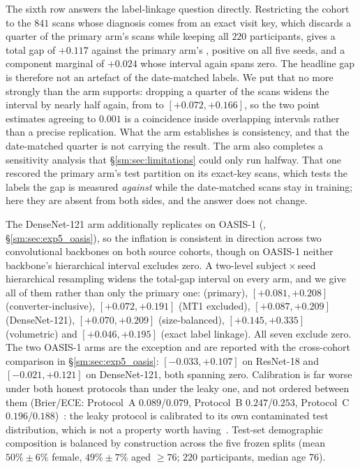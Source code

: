 \documentclass[11pt]{article}
\begin{document}
The sixth row answers the label-linkage question directly. Restricting
the cohort to the $841$ scans whose diagnosis comes from an exact visit
key, which discards a quarter of the primary arm's scans while keeping
all $220$ participants, gives a total gap of $+0.117$ against the
primary arm's \AdniGapTotal{}, positive on all five seeds, and a component
marginal of $+0.024$ whose interval again spans zero. The headline gap
is therefore not an artefact of the date-matched labels. We put that no
more strongly than the arm supports: dropping a quarter of the scans
widens the interval by nearly half again, from
\AdniGapCI{} to $[+0.072, +0.166]$, so the two point estimates
agreeing to $0.001$ is a coincidence inside overlapping intervals rather
than a precise replication. What the arm establishes is consistency, and
that the date-matched quarter is not carrying the result. The arm also
completes a sensitivity analysis that \S\ref{sm:sec:limitations} could
only run halfway. That one rescored the primary arm's test partition on
its exact-key scans, which tests the labels the gap is measured
\emph{against} while the date-matched scans stay in training; here they
are absent from both sides, and the answer does not change.

The DenseNet-121 arm additionally replicates on OASIS-1
(\OasisDenseGap{}, \S\ref{sm:sec:exp5_oasis}), so the inflation is
consistent in direction across two convolutional backbones on both
source cohorts, though on OASIS-1 neither backbone's hierarchical
interval excludes zero. A two-level subject\,$\times$\,seed
hierarchical resampling widens the total-gap interval on every arm, and
we give all of them rather than only the primary one: \AdniHierCI{}
(primary), $[+0.081, +0.208]$ (converter-inclusive), $[+0.072, +0.191]$
(MT1 excluded), $[+0.087, +0.209]$ (DenseNet-121), $[+0.070, +0.209]$
(size-balanced), $[+0.145, +0.335]$ (volumetric) and $[+0.046, +0.195]$
(exact label linkage). All seven exclude zero. The two OASIS-1 arms are the exception and are reported with the
cross-cohort comparison in \S\ref{sm:sec:exp5_oasis}: $[-0.033, +0.107]$ on
ResNet-18 and $[-0.021, +0.121]$ on DenseNet-121, both spanning zero. Calibration is far worse under
both honest protocols than under the leaky one, and not ordered
between them (Brier/ECE: Protocol~A $0.089$/$0.079$, Protocol~B
$0.247$/$0.253$, Protocol~C
$0.196$/$0.188$)~\cite{niculescu2005calibration,guo2017calibration}:
the leaky protocol is calibrated to its own contaminated test
distribution, which is not a property worth
having~\cite{vancalster2019calibration}. Test-set
demographic composition is balanced by construction across the five
frozen splits (mean $50\% \pm 6\%$ female, $49\% \pm 7\%$ aged
$\geq 76$; $220$ participants, median age 76).
\end{document}
